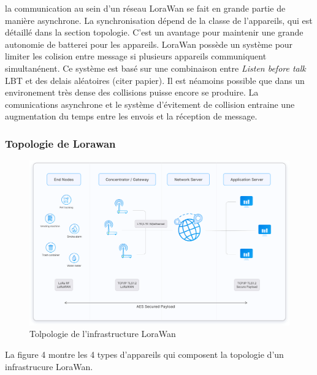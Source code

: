 \vspace{0.1cm}

la communication au sein d'un réseau LoraWan se fait en grande partie de manière asynchrone. La synchronisation dépend de la classe de l'appareils, qui est détaillé dans la section topologie. C'est un avantage pour maintenir une grande autonomie de batterei pour les appareils. LoraWan possède un système pour limiter les colision entre message si plusieurs appareils communiquent simultanénent. Ce système est basé sur une combinaison entre \textit{Listen before talk} LBT et des delais aléatoires (citer papier). Il est néamoins possible que dans un environement très dense des collisions puisse encore se produire. La comunications asynchrone et le système d'évitement de collision entraine une augmentation du temps entre les envois et la réception de message.

\subsubsection{Topologie de Lorawan}

\begin{figure}[h]
\centering

\includegraphics[scale=0.1]{images/architecture.png}
\caption{Tolpologie de l'infrastructure LoraWan}\label{term7}
\end{figure}

La figure 4 montre les 4 types d'appareils qui composent la topologie d'un infrastrucure LoraWan. 

